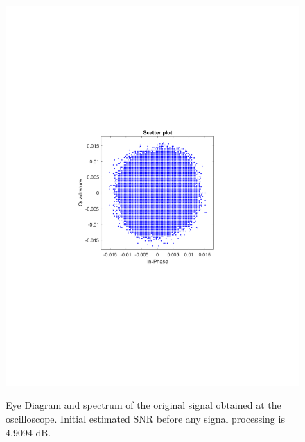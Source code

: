 \begin{refsection}
\begin{figure}[H]
\begin{minipage}{0.30\textwidth}
		\includegraphics[clip, trim=4cm 8cm 4cm 8cm, width=1\textwidth]{./sdf/m_qam_system/figures/expResults/homodyne/0_const_4GBdInSig13dB_bfFec.pdf}
		\label{fig:4GBdSpecBefFecCHm}
	\end{minipage}
	\caption{Eye Diagram and spectrum of the original signal obtained at the oscilloscope. Initial estimated SNR before any signal processing is 4.9094 dB.}
	\label{fig:4GBdinitHm}
\end{figure}


\end{refsection}
